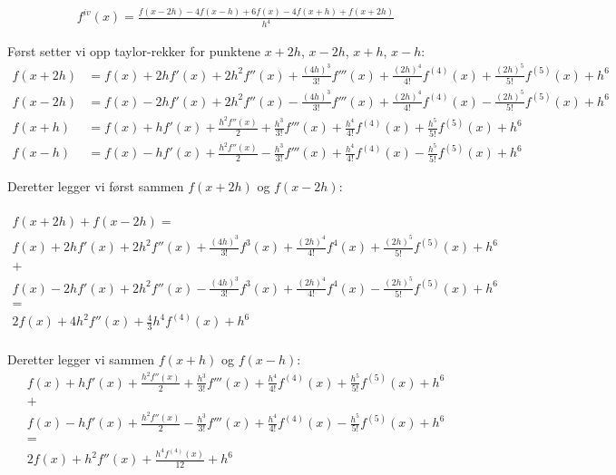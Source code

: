 \begin{align}
    f^{iv}(x)=\frac{f(x-2h)-4f(x-h)+6f(x)-4f(x+h)+f(x+2h)}{h^4} \label{eq21:proove}
\end{align}

Først setter vi opp taylor-rekker for punktene $x+2h$, $x-2h$, $x+h$, $x-h$: 
\begin{align}
    f(x+2h)&=f(x)+2hf'(x)+2h^2f''(x)+\frac{(4h)^3}{3!}f'''(x)+\frac{(2h)^4}{4!}f^{(4)}(x)+\frac{(2h)^5}{5!}f^{(5)}(x)+h^6\nonumber\\ 
    f(x-2h)&=f(x)-2hf'(x)+2h^2f''(x)-\frac{(4h)^3}{3!}f'''(x)+\frac{(2h)^4}{4!}f^{(4)}(x)-\frac{(2h)^5}{5!}f^{(5)}(x)+h^6\nonumber\\
    f(x+h)&=f(x)+hf'(x)+\frac{h^2f''(x)}{2}+\frac{h^3}{3!}f'''(x)+\frac{h^4}{4!}f^{(4)}(x)+\frac{h^5}{5!}f^{(5)}(x)+h^6\nonumber\\
    f(x-h)&=f(x)-hf'(x)+\frac{h^2f''(x)}{2}-\frac{h^3}{3!}f'''(x)+\frac{h^4}{4!}f^{(4)}(x)-\frac{h^5}{5!}f^{(5)}(x)+h^6\label{Theory:taylorrekker}
\end{align}

Deretter legger vi først sammen $f(x+2h)$ og $f(x-2h)$: 

\begin{multline}
    \\
    f(x+2h)+f(x-2h)= \\
    f(x)+2hf'(x)+2h^2f''(x)+\frac{(4h)^3}{3!}f^3(x)+\frac{(2h)^4}{4!}f^{4}(x)+\frac{(2h)^5}{5!}f^{(5)}(x)+h^6 \\
    + \\
  	f(x)-2hf'(x)+2h^2f''(x)-\frac{(4h)^3}{3!}f^3(x)+\frac{(2h)^4}{4!}f^{4}(x)-\frac{(2h)^5}{5!}f^{(5)}(x)+h^6\nonumber \\
  	=\\
  	2f(x)+4h^2f''(x)+\frac{4}{3}h^4f^{(4)}(x)+h^6 \nonumber\\
\end{multline}

Deretter legger vi sammen $f(x+h)$ og $f(x-h)$: 
\begin{multline}
	f(x)+hf'(x)+\frac{h^2f''(x)}{2}+\frac{h^3}{3!}f'''(x)+\frac{h^4}{4!}f^{(4)}(x)+\frac{h^5}{5!}f^{(5)}(x)+h^6\\
	+\\
	f(x)-hf'(x)+\frac{h^2f''(x)}{2}-\frac{h^3}{3!}f'''(x)+\frac{h^4}{4!}f^{(4)}(x)-\frac{h^5}{5!}f^{(5)}(x)+h^6\\
	=\\
	2f(x)+h^2f''(x)+\frac{h^4f^{(4)}(x)}{12} + h^6 \nonumber \\
\end{multline}

